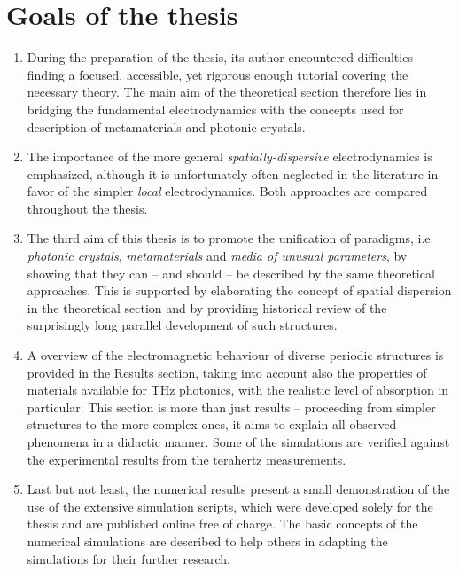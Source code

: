 
\section{Goals of the thesis}
\begin{enumerate}
\item{During the preparation of the thesis, its author encountered difficulties finding a focused, accessible, yet rigorous enough tutorial covering the necessary theory. The main aim of the theoretical section therefore lies in bridging the fundamental electrodynamics with the concepts used for description of metamaterials and photonic crystals.} 
\item{The importance of the more general \textit{spatially-dispersive} electrodynamics is emphasized, although it is unfortunately often neglected in the literature in favor of the simpler \textit{local} electrodynamics. Both approaches are compared throughout the thesis.} 
\item{The third aim of this thesis is to promote the unification of paradigms, i.e. \textit{photonic crystals}, \textit{metamaterials} and \textit{media of unusual parameters}, by showing that they can -- and should -- be described by the same theoretical approaches. This is supported by elaborating the concept of spatial dispersion in the theoretical section and by providing historical review of the surprisingly long parallel development of such structures.} 
\item{A overview of the electromagnetic behaviour of diverse periodic structures is provided in the Results section, taking into account also the properties of materials available for THz photonics, with the realistic level of absorption in particular. This section is more than just results -- proceeding from simpler structures to the more complex ones, it aims to explain all observed phenomena in a didactic manner. Some of the simulations are verified against the experimental results from the terahertz measurements.} 
\item{Last but not least, the numerical results present a small demonstration of the use of the extensive simulation scripts, which were developed solely for the thesis and are published online free of charge. The basic concepts of the numerical simulations are described to help others in adapting the simulations for their further research. } 
\end{enumerate}

